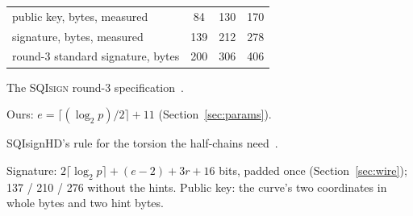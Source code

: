\documentclass[version=preprint]{iacrcc}
\newcommand{\SQIsign}{SQI{\textsc{sign}}}
\begin{document}
\begin{table}[t]
\begin{threeparttable}
\begin{tabular}{l c c c}
                public key, bytes, measured & 84 & 130 & 170 \\
                signature, bytes, measured & 139 & 212 & 278 \\
                round-3 standard signature, bytes\tnote{a} & 200 & 306 & 406 \\
                \bottomrule
            \end{tabular}
            \begin{tablenotes}\footnotesize
                \item[a] The {\SQIsign} round-3 specification~\cite{AAA+26}.
                \item[b] Ours: $e = \lceil (\log_2 p)/2 \rceil + 11$ (Section~\ref{sec:params}).
                \item[c] SQIsignHD's rule for the torsion the half-chains need~\cite[Section 4.3]{DLRW24}.
                \item[d] Signature: $2 \lceil \log_2 p \rceil + (e - 2) + 3r + 16$ bits, padded once (Section~\ref{sec:wire}); 137 / 210 / 276 without the hints. Public key: the curve's two coordinates in whole bytes and two hint bytes.
            \end{tablenotes}
        \end{threeparttable}
    \end{table}
\end{document}
